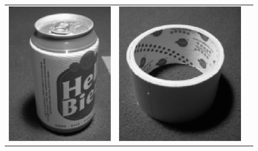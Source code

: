 \begin{figure}[htbp]
  \begin{center}
    \begin{tabular}{ccc}
      \includegraphics[height=0.2\textheight]{beer.eps} &
      \includegraphics[height=0.2\textheight]{scotch.eps}  &

\end{tabular}
\end{center}
\end{figure}
